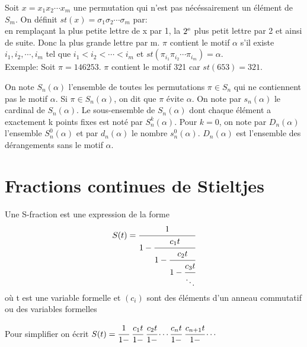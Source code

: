 		Soit $ x = x_{1}x_{2}\cdots x_{m} $ une permutation qui n'est pas nécéssairement un élément de $ S_{m} $. On définit $st(x) = \sigma_{1}\sigma_{2}\cdots \sigma_{m}$ par:\\
		en remplaçant la plus petite lettre de x par 1, la $2\textsuperscript{e}$ plus petit lettre par 2 et ainsi de suite. Donc la plus grande lettre par m. $\pi $ contient le motif $\alpha$ s'il existe $i_{1},i_{2}, \cdots ,i_{m}$ tel que $i_{1}<i_{2}< \cdots <i_{m}$ et $st(\pi_{i_{1}}\pi_{i_{2}}\cdots \pi_{i_{m}})=\alpha$.\\
		Exemple: Soit $\pi = 146253$. $\pi$ contient le motif 321 car $st(653)=321$.

		
		On note  $S_{n}(\alpha)$ l'ensemble de toutes les permutations $\pi \in S_{n}$ qui ne contiennent pas le motif $\alpha$. Si  $\pi \in S_{n}(\alpha)$, on dit que $\pi$ évite $\alpha$.
		On note par $s_{n}(\alpha)$ le cardinal de  $S_{n}(\alpha)$.
		Le sous-ensemble de  $S_{n}(\alpha)$ dont chaque élément a exactement k points fixes est noté par $S_{n}^k(\alpha)$.\newline
		Pour $k=0$, on note par $D_{n}(\alpha)$ l'ensemble $S_{n}^{0}(\alpha)$ et par $d_{n}(\alpha)$ le nombre  $s_{n}^{0}(\alpha)$.
		$D_{n}(\alpha)$ est l'ensemble des dérangements sans le motif $\alpha$.

	\section{Fractions continues de Stieltjes}

		\begin{definition}
			\begin{rm}
				Une S-fraction est une expression de la forme
				\[
				S(t)=\cfrac{1}{1-\cfrac{c_{1}t}{1-\cfrac{c_{2}t}{1-\cfrac{c_{3}t}{\ddots}}}}
				\]
				où t est une variable formelle et $(c_{i})$ sont des éléments d'un anneau commutatif ou des variables formelles
			\end{rm} 
		\end{definition}

		Pour simplifier on écrit
		$S(t)=\cfrac{1}{1-}\hspace*{3pt}\cfrac{c_{1}t}{1-}\hspace*{3pt}\cfrac{c_{2}t}{1-}\cdots\cfrac{c_{n}t}{1-}\hspace*{3pt}\cfrac{c_{n+1}t}{1-}\cdots$


